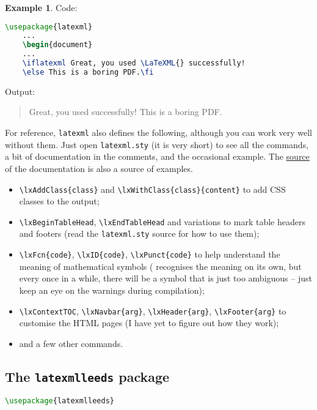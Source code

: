 \documentclass[a4paper]{article}
\theoremstyle{definition}
\newtheorem{exa}{Example}[subsection]
\begin{document}
\begin{exa}
  Code:
  \begin{lstlisting}[language=TeX]
    \usepackage{latexml}
    ...
    \begin{document}
    ...
    \iflatexml Great, you used \LaTeXML{} successfully!
    \else This is a boring PDF.\fi
  \end{lstlisting}
  Output:
  \begin{quote}
    \iflatexml Great, you used \LaTeXML{} successfully!
    \else This is a boring PDF.\fi
  \end{quote}
\end{exa}

For reference, \verb|latexml| also defines the following, although you can work very well without them. Just open \verb|latexml.sty| (it is very short) to see all the commands, a bit of documentation in the comments, and the occasional example. The \href{https://github.com/brucemiller/LaTeXML/tree/master/doc/manual}{source} of the \LaTeXML{} documentation is also a source of examples.
\begin{itemize}
  \item \verb|\lxAddClass{class}| and \verb|\lxWithClass{class}{content}| to add CSS classes to the output;
  \item \verb|\lxBeginTableHead|, \verb|\lxEndTableHead| and variations to mark table headers and footers (read the \verb|latexml.sty| source for how to use them);
  \item \verb|\lxFcn{code}|, \verb|\lxID{code}|, \verb|\lxPunct{code}| to help \LaTeXML{} understand the meaning of mathematical symbols (\LaTeXML{} recognises the meaning on its own, but every once in a while, there will be a symbol that is just too ambiguous -- just keep an eye on the warnings during compilation);
  \item \verb|\lxContextTOC|, \verb|\lxNavbar{arg}|, \verb|\lxHeader{arg}|, \verb|\lxFooter{arg}| to customise the HTML pages (I have yet to figure out how they work);
  \item and a few other commands.
\end{itemize}

\subsection{The \texttt{latexmlleeds} package}
\begin{lstlisting}[language=TeX,caption={Import \texttt{latexmlleeds} in the preamble}]
  \usepackage{latexmlleeds}
\end{lstlisting}
\end{document}
